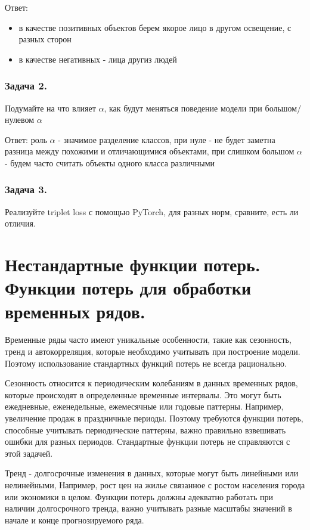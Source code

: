 Ответ: 
\begin{itemize}
    \item в качестве позитивных объектов берем якорое лицо в другом освещение, с разных сторон
    \item в качестве негативных - лица другиз людей
\end{itemize}

\subsubsection*{Задача 2.}

Подумайте на что влияет $\alpha$, как будут меняться поведение модели при большом/нулевом $\alpha$

Ответ: роль $\alpha$ - значимое разделение классов, 
при нуле - не будет заметна разница между похожими и отличающимися объектами,
при слишком большом $\alpha$ - будем часто считать объекты одного класса различными

\subsubsection*{Задача 3.}

Реализуйте triplet loss с помощью PyTorch, для разных норм, сравните, есть ли отличия.


\newpage

\section*{Нестандартные функции потерь. Функции потерь для обработки временных рядов.}

Временные ряды часто имеют уникальные особенности, такие как сезонность, тренд и автокорреляция, которые необходимо учитывать при построение модели. Поэтому использование стандартных функций потерь не всегда рационально.

Сезонность относится к периодическим колебаниям в данных временных рядов, которые происходят в определенные временные интервалы. Это могут быть ежедневные, еженедельные, ежемесячные или годовые паттерны. Например, увеличение продаж в праздничные периоды.
Поэтому требуются функции потерь, способные учитывать периодические паттерны, важно правильно взвешивать ошибки для разных периодов. Стандартные функции потерь не справляются с этой задачей.

Тренд - долгосрочные изменения в данных, которые могут быть линейными или нелинейными,
Например, рост цен на жилье связанное с ростом населения города или экономики в целом.
Функции потерь должны адекватно работать при наличии долгосрочного тренда, важно учитывать разные масштабы значений в начале и конце прогнозируемого ряда.

